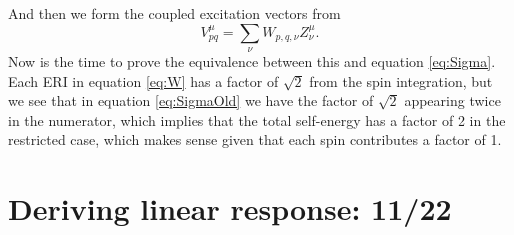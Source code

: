 \documentclass[12pt]{article}
\begin{document}
And then we form the coupled excitation vectors from
\begin{equation}
    {V}_{pq}^{\mu} = \sum_{\nu} {W}_{p,q,\nu} {Z}_{\nu}^{\mu}.
\label{eq:V}
\end{equation}
Now is the time to prove the equivalence between this and equation \ref{eq:Sigma}. Each ERI in equation \ref{eq:W} has a factor of $\sqrt{2}$ from the spin integration, but we see that in equation \ref{eq:SigmaOld} we have the factor of $\sqrt{2}$ appearing twice in the numerator, which implies that the total self-energy has a factor of 2 in the restricted case, which makes sense given that each spin contributes a factor of 1.
\section{Deriving linear response: 11/22}
\end{document}
